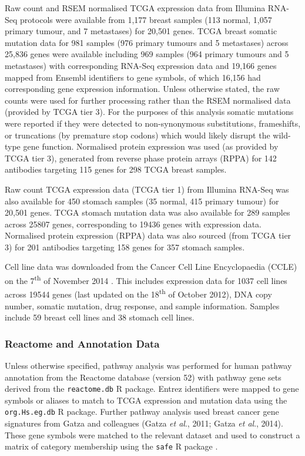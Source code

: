 Raw count and RSEM normalised TCGA expression data from Illumina RNA-Seq protocols were available from 1,177 breast samples (113 normal, 1,057 primary tumour, and 7 metastases) for 20,501 genes. TCGA breast somatic mutation data for 981 samples (976 primary tumours and 5 metastases) across 25,836 genes were available including 969 samples (964 primary tumours and 5 metastases) with corresponding RNA-Seq expression data and 19,166 genes mapped from Ensembl identifiers to gene symbols, of which 16,156 had corresponding gene expression information. Unless otherwise stated, the raw counts were used for further processing rather than the RSEM normalised data (provided by TCGA tier 3). For the purposes of this analysis somatic mutations were reported if they were detected to non-synonymous substitutions, frameshifts, or truncations (by premature stop codons) which would likely disrupt the wild-type gene function. Normalised protein expression was used (as provided by TCGA tier 3), generated from reverse phase protein arrays (RPPA) for 142 antibodies targeting 115 genes for 298 TCGA breast samples.

Raw count TCGA expression data (TCGA tier 1) from Illumina RNA-Seq was also available for 450 stomach samples (35 normal, 415 primary tumour) for 20,501 genes. TCGA stomach mutation data was also available for 289 samples across 25807 genes, corresponding to 19436 genes with expression data. Normalised protein expression (RPPA) data was also sourced (from TCGA tier 3) for 201 antibodies targeting 158 genes for 357 stomach samples.

Cell line data was downloaded from the Cancer Cell Line Encyclopaedia (CCLE) on the 7\textsuperscript{th} of November 2014 \citep{Barretina2012, CCLE}. This includes expression data for 1037 cell lines across 19544 genes (last updated on the 18\textsuperscript{th} of October 2012), DNA copy number, somatic mutation, drug response, and sample information. Samples include 59 breast cell lines and 38 stomach cell lines.


\subsubsection{Reactome and Annotation Data} \label{methods:gene_set}

Unless otherwise specified, pathway analysis was performed for human pathway annotation from the Reactome database (version 52) with pathway gene sets derived from the \texttt{reactome.db} R package. Entrez identifiers were mapped to gene symbols or aliases to match to TCGA expression and mutation data using the \texttt{org.Hs.eg.db} R package. Further pathway analysis used breast cancer gene signatures from Gatza and colleagues (Gatza \textit{et al}., 2011; Gatza \textit{et al}., 2014). These gene symbols were matched to the relevant dataset and used to construct a matrix of category membership using the \texttt{safe} R package \citep{safe}.

